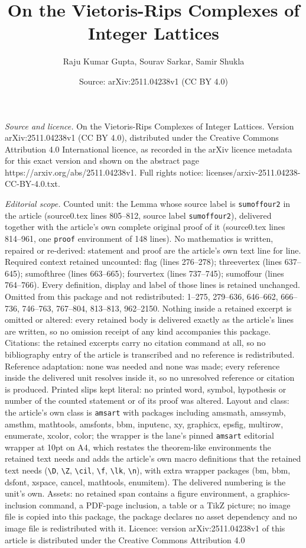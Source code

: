 \documentclass[10pt,a4paper]{amsart}
\title[On the Vietoris-Rips Complexes of Integer Lattices]{On the Vietoris-Rips Complexes of Integer Lattices}
\author{Raju Kumar Gupta, Sourav Sarkar, Samir Shukla}
\date{Source: arXiv:2511.04238v1 (CC BY 4.0)}
\begin{document}
\maketitle

\noindent\emph{Source and licence.} On the Vietoris-Rips Complexes of Integer Lattices. Version arXiv:2511.04238v1 (CC BY 4.0), distributed under the Creative Commons Attribution 4.0 International licence, as recorded in the arXiv licence metadata for this exact version and shown on the abstract page https://arxiv.org/abs/2511.04238v1. Full rights notice: licenses/arxiv-2511.04238-CC-BY-4.0.txt.\par\smallskip

\noindent\textit{Editorial scope.} Counted unit: the Lemma whose source label is \texttt{sumoffour2} in the article (source0.tex lines 805--812, source label \texttt{sumoffour2}), delivered together with the article's own complete original proof of it (source0.tex lines 814--961, one \texttt{proof} environment of 148 lines). No mathematics is written, repaired or re-derived: statement and proof are the article's own text line for line. Required context retained uncounted: flag (lines 276--278); threevertex (lines 637--645); sumofthree (lines 663--665); fourvertex (lines 737--745); sumoffour (lines 764--766). Every definition, display and label of those lines is retained unchanged. Omitted from this package and not redistributed: 1--275, 279--636, 646--662, 666--736, 746--763, 767--804, 813--813, 962--2150. Nothing inside a retained excerpt is omitted or altered: every retained body is delivered exactly as the article's lines are written, so no omission receipt of any kind accompanies this package. Citations: the retained excerpts carry no citation command at all, so no bibliography entry of the article is transcribed and no reference is redistributed. Reference adaptation: none was needed and none was made; every reference inside the delivered unit resolves inside it, so no unresolved reference or citation is produced. Printed slips kept literal: no printed word, symbol, hypothesis or number of the counted statement or of its proof was altered. Layout and class: the article's own class is \texttt{amsart} with packages including amsmath, amssymb, amsthm, mathtools, amsfonts, bbm, inputenc, xy, graphicx, epsfig, multirow, enumerate, xcolor, color; the wrapper is the lane's pinned \texttt{amsart} editorial wrapper at 10pt on A4, which restates the theorem-like environments the retained text needs and adds the article's own macro definitions that the retained text needs (\texttt{\textbackslash D}, \texttt{\textbackslash Z}, \texttt{\textbackslash cil}, \texttt{\textbackslash f}, \texttt{\textbackslash lk}, \texttt{\textbackslash n}), with extra wrapper packages (bm, bbm, dsfont, xspace, cancel, mathtools, enumitem). The delivered numbering is the unit's own. Assets: no retained span contains a figure environment, a graphics-inclusion command, a PDF-page inclusion, a table or a TikZ picture; no image file is copied into this package, the package declares no asset dependency and no image file is redistributed with it. Licence: version arXiv:2511.04238v1 of this article is distributed under the Creative Commons Attribution 4.0 
\end{document}
